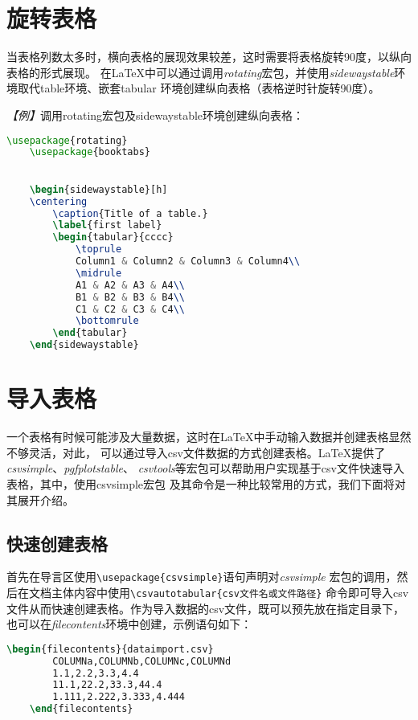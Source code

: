 \section{旋转表格}

当表格列数太多时，横向表格的展现效果较差，这时需要将表格旋转90度，以纵向表格的形式展现。
在LaTeX中可以通过调用\emph{rotating}宏包，并使用\emph{sidewaystable}环境取代table环境、嵌套tabular
环境创建纵向表格（表格逆时针旋转90度）。

\emph{【例】}调用rotating宏包及sidewaystable环境创建纵向表格：
\begin{lstlisting}[language=TeX]
    \usepackage{rotating}
    \usepackage{booktabs}
    

    \begin{sidewaystable}[h]
    \centering
        \caption{Title of a table.}
        \label{first label}
        \begin{tabular}{cccc}
            \toprule
            Column1 & Column2 & Column3 & Column4\\
            \midrule
            A1 & A2 & A3 & A4\\
            B1 & B2 & B3 & B4\\
            C1 & C2 & C3 & C4\\
            \bottomrule
        \end{tabular}
    \end{sidewaystable}
\end{lstlisting}

\section{导入表格}

一个表格有时候可能涉及大量数据，这时在LaTeX中手动输入数据并创建表格显然不够灵活，对此，
可以通过导入csv文件数据的方式创建表格。LaTeX提供了\emph{csvsimple}、\emph{pgfplotstable}、
\emph{csvtools}等宏包可以帮助用户实现基于csv文件快速导入表格，其中，使用csvsimple宏包
及其命令是一种比较常用的方式，我们下面将对其展开介绍。

\subsection{快速创建表格}

首先在导言区使用\texttt{\textbackslash{}usepackage\{csvsimple\}}语句声明对\emph{csvsimple}
宏包的调用，然后在文档主体内容中使用\texttt{\textbackslash{}csvautotabular\{csv文件名或文件路径\}}
命令即可导入csv文件从而快速创建表格。作为导入数据的csv文件，既可以预先放在指定目录下，
也可以在\emph{filecontents}环境中创建，示例语句如下：
\begin{lstlisting}[language=TeX]
    \begin{filecontents}{dataimport.csv}
        COLUMNa,COLUMNb,COLUMNc,COLUMNd
        1.1,2.2,3.3,4.4
        11.1,22.2,33.3,44.4
        1.111,2.222,3.333,4.444
    \end{filecontents}
\end{lstlisting}

